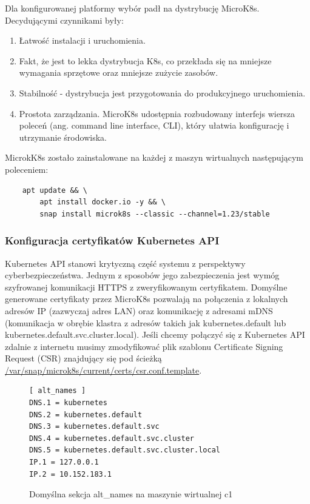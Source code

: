 \begin{samepage}
    Dla konfigurowanej platformy wybór padł na dystrybucję MicroK8s\cite{microk8s-docs-home}.
    Decydującymi czynnikami były:
    \begin{enumerate}
        \item Łatwość instalacji i uruchomienia.
        \item Fakt, że jest to lekka dystrybucja K8s, co przekłada się na mniejsze wymagania sprzętowe oraz mniejsze zużycie zasobów.
        \item Stabilność - dystrybucja jest przygotowania do produkcyjnego uruchomienia.
        \item Prostota zarządzania. MicroK8s udostępnia rozbudowany interfejs wiersza poleceń (ang. command line interface, CLI), który ułatwia konfigurację i utrzymanie środowiska.
    \end{enumerate}
\end{samepage}

MicrokK8s zostało zainstalowane na każdej z maszyn wirtualnych następującym poleceniem:
\begin{verbatim}
    apt update && \
        apt install docker.io -y && \
        snap install microk8s --classic --channel=1.23/stable
\end{verbatim}

\subsubsection{Konfiguracja certyfikatów Kubernetes API}

Kubernetes API stanowi krytyczną część systemu z perspektywy cyberbezpieczeństwa.
Jednym z sposobów jego zabezpieczenia jest wymóg szyfrowanej komunikacji HTTPS z zweryfikowanym certyfikatem.
Domyślne generowane certyfikaty przez MicroK8s pozwalają na połączenia z lokalnych adresów IP (zazwyczaj adres LAN) oraz komunikację z adresami mDNS (komunikacja w obrębie klastra z adresów takich jak kubernetes.default lub kubernetes.default.svc.cluster.local).
Jeśli chcemy połączyć się z Kubernetes API zdalnie z internetu musimy zmodyfikować plik szablonu Certificate Signing Request (CSR) znajdujący się pod ścieżką \url{ /var/snap/microk8s/current/certs/csr.conf.template}.

\begin{figure}[H]
    \begin{verbatim}
[ alt_names ]
DNS.1 = kubernetes
DNS.2 = kubernetes.default
DNS.3 = kubernetes.default.svc
DNS.4 = kubernetes.default.svc.cluster
DNS.5 = kubernetes.default.svc.cluster.local
IP.1 = 127.0.0.1
IP.2 = 10.152.183.1
    \end{verbatim}
    \caption{Domyślna sekcja alt\_names na maszynie wirtualnej c1}
    \label{fig:domyslna-konfiguracja-alt-names}
\end{figure}


